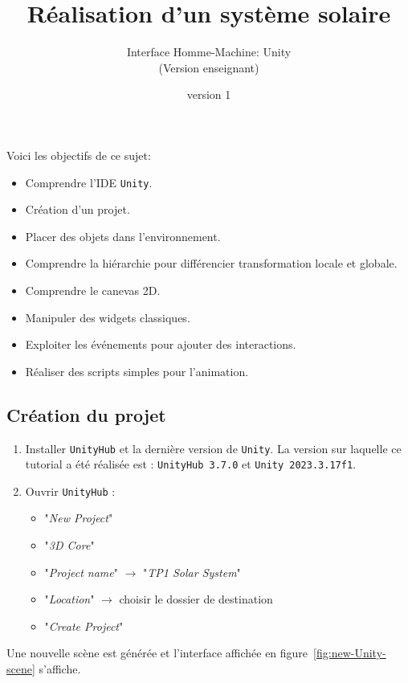 \documentclass[a4paper,10pt]{article}
\newenvironment{solution}%
{\begin{tcolorbox}[breakable,colback=red!5!white,colframe=red!75!black,title=Solution]}%
{\end{tcolorbox}}
\begin{document}
	


\title{\vspace*{-1cm}Réalisation d'un système solaire}
\author{\vspace*{-1.5cm}Interface Homme-Machine: Unity
\begin{ensnote}
	(Version enseignant)
\end{ensnote}
}
\date{\vspace*{-1.5cm}version 1}
\maketitle
\thispagestyle{fancy}


Voici les objectifs de ce sujet:
\begin{itemize}
	\item Comprendre l'IDE \texttt{Unity}.
	\item Création d'un projet.
	\item Placer des objets dans l'environnement.
	\item Comprendre la hiérarchie pour différencier transformation locale et globale.
	\item Comprendre le canevas 2D.
	\item Manipuler des widgets classiques.
	\item Exploiter les événements pour ajouter des interactions.
	\item Réaliser des scripts simples pour l'animation.
\end{itemize}


\ifversionenseignant
\begin{solution}
\section{Création du projet}

\begin{enumerate}
	\item Installer  \texttt{UnityHub} et la dernière version de \texttt{Unity}. La version sur laquelle ce tutorial a été réalisée est : \texttt{UnityHub 3.7.0} et \texttt{Unity 2023.3.17f1}.
	\item  Ouvrir \texttt{UnityHub} :
	\begin{itemize}
		\item "\textit{New Project}"
		\item "\textit{3D Core}"
		\item "\textit{Project name}" $\rightarrow$ "\textit{TP1 Solar System}"
		\item "\textit{Location}" $\rightarrow$ choisir le dossier de destination
		\item "\textit{Create Project}"		
	\end{itemize}
\end{enumerate}

	
Une nouvelle scène est générée et l'interface affichée en figure~\ref{fig:new-Unity-scene} s'affiche.
\end{solution}
\end{document}
